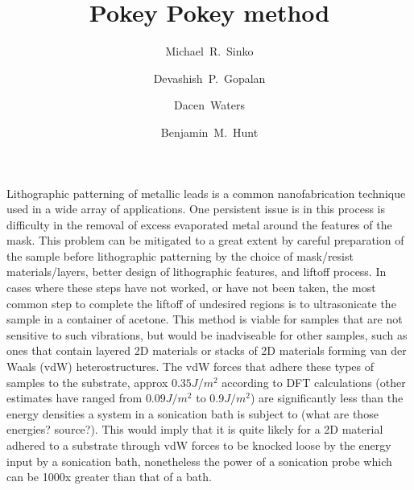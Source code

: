 \documentclass[prl,amsmath,twocolumn,amssymb,superscriptaddress,linenumbers]{revtex4-1}
\begin{document}
\title{Pokey Pokey method}

\author{Michael~R.~Sinko} 
\author{Devashish~P.~Gopalan}%
\author{Dacen~Waters}%

\author{Benjamin~M.~Hunt} 

\begin{abstract}
 
\end{abstract}
\maketitle

Lithographic patterning of metallic leads is a common nanofabrication technique used in a wide array of applications. One persistent issue is in this process is difficulty in the removal of excess evaporated metal around the features of the mask. This problem can be mitigated to a great extent by careful preparation of the sample before lithographic patterning by the choice of mask/resist materials/layers, better design of lithographic features, and liftoff process. In cases where these steps have not worked, or have not been taken, the most common step to complete the liftoff of undesired regions is to ultrasonicate the sample in a container of acetone. This method is viable for samples that are not sensitive to such vibrations, but would be inadviseable for other samples, such as ones that contain layered 2D materials or stacks of 2D materials forming van der Waals (vdW) heterostructures.  
The vdW forces that adhere these types of samples to the substrate, approx $0.35J/m^2$ according to DFT calculations (other estimates have ranged from $0.09J/m^2$ to $0.9J/m^2$) are significantly less than the energy densities a system in a sonication bath is subject to (what are those energies? source?). This would imply that it is quite likely for a 2D material adhered to a substrate through vdW forces to be knocked loose by the energy input by a sonication bath, nonetheless the power of a sonication probe which can be 1000x greater than that of a bath.
\end{document}
